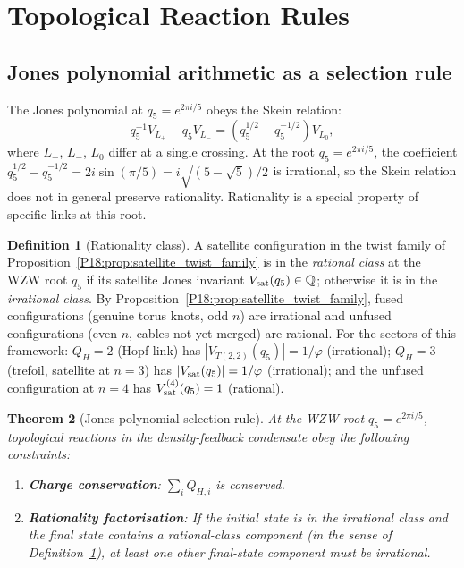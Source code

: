 \documentclass[11pt,a4paper]{article}
\newtheorem{theorem}{Theorem}[section]
\theoremstyle{definition}\newtheorem{definition}[theorem]{Definition}
\theoremstyle{remark}
\newcommand{\vp}{\varphi}
\newcommand{\QH}{Q_H}
\newcommand{\Jones}{V}
\begin{document}
\section{Topological Reaction Rules}
\label{P18:sec:reaction_rules}

\subsection{Jones polynomial arithmetic as a selection rule}
\label{P18:sec:skein_rules}

The Jones polynomial at $q_5=e^{2\pi i/5}$ obeys the Skein relation:
\begin{equation}
  q_5^{-1}\Jones_{L_+} - q_5\Jones_{L_-}
  = (q_5^{1/2}-q_5^{-1/2})\Jones_{L_0},
  \label{P18:eq:skein}
\end{equation}
where $L_+$, $L_-$, $L_0$ differ at a single crossing.
At the root $q_5=e^{2\pi i/5}$, the coefficient
$q_5^{1/2}-q_5^{-1/2}=2i\sin(\pi/5)=i\sqrt{(5-\sqrt5)/2}$ is
irrational, so the Skein relation does not in general preserve
rationality.  Rationality is a special property of specific links
at this root.

\begin{definition}[Rationality class]
\label{P18:def:rational_class}
A satellite configuration in the twist family of
Proposition~\ref{P18:prop:satellite_twist_family} is in the
\emph{rational class} at the WZW root $q_5$ if its satellite Jones
invariant $\Jones_{\rm sat}(q_5)\in\mathbb{Q}$; otherwise it is in
the \emph{irrational class}.  By
Proposition~\ref{P18:prop:satellite_twist_family}, fused
configurations (genuine torus knots, odd $n$) are irrational and
unfused configurations (even $n$, cables not yet merged) are rational.
For the sectors of this framework: $\QH=2$ (Hopf link) has
$|\Jones_{T(2,2)}(q_5)|=1/\vp$ (irrational); $\QH=3$ (trefoil,
satellite at $n=3$) has $|\Jones_{\rm sat}(q_5)|=1/\vp$ (irrational);
and the unfused configuration at $n=4$ has
$\Jones_{\rm sat}^{(4)}(q_5)=1$ (rational).
\end{definition}

\begin{theorem}[Jones polynomial selection rule]
\label{P18:thm:jones_rule}
At the WZW root $q_5=e^{2\pi i/5}$, topological reactions
in the density-feedback condensate obey the following constraints:
\begin{enumerate}[noitemsep,label=(\roman*)]
\item \textbf{Charge conservation}: $\sum_i Q_{H,i}$ is conserved.
\item \textbf{Rationality factorisation}: If the initial state is in the
  irrational class and the final state contains a rational-class
  component (in the sense of Definition~\ref{P18:def:rational_class}),
  at least one other final-state component must be irrational.
\end{enumerate}
\end{theorem}
\end{document}
